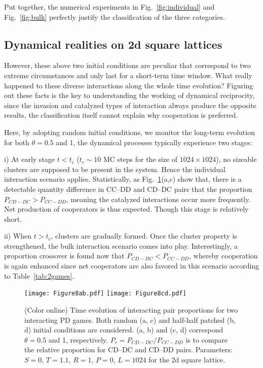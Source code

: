 \documentclass[showpacs,superscriptaddress,reprint,nofootinbib,amsmath,amssymb,aps,pre]{revtex4-1}
\begin{document}
Put together, the numerical experiments in Fig.~\ref{fig:individual} and Fig.~\ref{fig:bulk} perfectly justify the classification of the three categories.

\subsection{Dynamical realities on 2d square lattices}\label{subsec:reality}
However, these above two initial conditions are peculiar that correspond to two extreme circumstances and only last for a short-term time window. 
What really happened to these diverse interactions along the whole time evolution? Figuring out these facts is the key to understanding the working of dynamical reciprocity, since the invasion and catalyzed types of interaction always produce the opposite results, the classification itself cannot explain why cooperation is preferred.

Here, by adopting random initial conditions, we monitor the long-term evolution for both $\theta=0.5$ and 1, the dynamical processes typically experience two stages: 

i) At early stage $t<t_c$ ($t_c \sim 10$ MC steps for the size of $1024\times1024$), no sizeable clusters are supposed to be present in the system. Hence the individual interaction scenario applies. Statistically, as Fig.~\ref{fig:interface}(a,c) show that, there is a detectable quantity difference in CC--DD and CD--DC pairs that the proportion $P_{CD-DC}>P_{CC-DD}$, meaning the catalyzed interactions occur more frequently. Net production of cooperators is thus expected. Though this stage is relatively short.

ii) When $t>t_c$, clusters are gradually formed. Once the cluster property is strengthened, the bulk interaction scenario comes into play. Interestingly, a proportion crossover is found now that $P_{CD-DC}<P_{CC-DD}$, whereby cooperation is again enhanced since net cooperators are also favored in this scenario according to Table~\ref{tab:2games}.

 \begin{figure}[t]%
\centering
\texttt{[image: Figure8ab.pdf]}
\texttt{[image: Figure8cd.pdf]}
\caption{(Color online)
Time evolution of interacting pair proportions for two interacting PD games.
Both random (a, c) and half-half patched (b, d) initial conditions are considered. 
(a, b) and (c, d) correspond $\theta=0.5$ and 1, respectively.
$P_r=P_{CD-DC}/P_{CC-DD}$ is to compare the relative proportion for CD--DC and CD--DD pairs.
Parameters: $S=0$, $T=1.1$, $R=1$, $P=0$, $L=1024$ for the 2d square lattice.
}
\label{fig:interface}
\end{figure}
\end{document}
